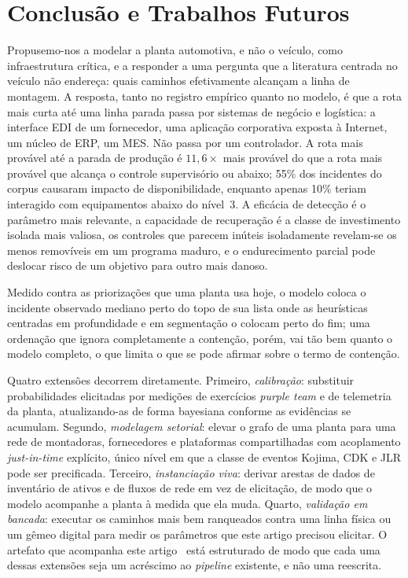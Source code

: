 \section{Conclusão e Trabalhos Futuros}

Propusemo-nos a modelar a planta automotiva, e não o veículo, como
infraestrutura crítica, e a responder a uma pergunta que a literatura centrada
no veículo não endereça: quais caminhos efetivamente alcançam a linha de
montagem. A resposta, tanto no registro empírico quanto no modelo, é que a rota
mais curta até uma linha parada passa por sistemas de negócio e logística: a interface EDI de um fornecedor,
uma aplicação corporativa exposta à Internet, um núcleo de ERP, um MES. Não
passa por um controlador. A rota mais provável até
a parada de produção é $11{,}6\times$ mais provável do que a rota mais provável
que alcança o controle supervisório ou abaixo; 55\% dos incidentes do corpus
causaram impacto de disponibilidade, enquanto apenas 10\% teriam interagido com
equipamentos abaixo do nível~3. A eficácia de detecção é o parâmetro mais
relevante, a capacidade de recuperação é a classe de investimento isolada mais
valiosa, os controles que parecem inúteis isoladamente revelam-se os menos
removíveis em um programa maduro, e o endurecimento parcial pode deslocar risco
de um objetivo para outro mais danoso.

Medido contra as priorizações que uma planta usa hoje, o modelo coloca o
incidente observado mediano perto do topo de sua lista onde as heurísticas
centradas em profundidade e em segmentação o colocam perto do fim; uma ordenação
que ignora completamente a contenção, porém, vai tão bem quanto o modelo
completo, o que limita o que se pode afirmar sobre o termo de contenção.

Quatro extensões decorrem diretamente. Primeiro, \emph{calibração}: substituir
probabilidades elicitadas por medições de exercícios \emph{purple team} e de
telemetria da planta, atualizando-as de forma bayesiana conforme as evidências
se acumulam. Segundo, \emph{modelagem setorial}: elevar o grafo de uma planta
para uma rede de montadoras, fornecedores e plataformas compartilhadas com
acoplamento \emph{just-in-time} explícito, único nível em que a classe de
eventos Kojima, CDK e JLR pode ser precificada. Terceiro, \emph{instanciação
viva}: derivar arestas de dados de inventário de ativos e de fluxos de rede em
vez de elicitação, de modo que o modelo acompanhe a planta à medida que ela
muda. Quarto, \emph{validação em bancada}: executar os caminhos mais bem
ranqueados contra uma linha física ou um gêmeo digital para medir os parâmetros
que este artigo precisou elicitar. O artefato que acompanha este
artigo~\cite{capmartifact} está estruturado de modo que cada uma dessas
extensões seja um acréscimo ao \emph{pipeline} existente, e não uma reescrita.

